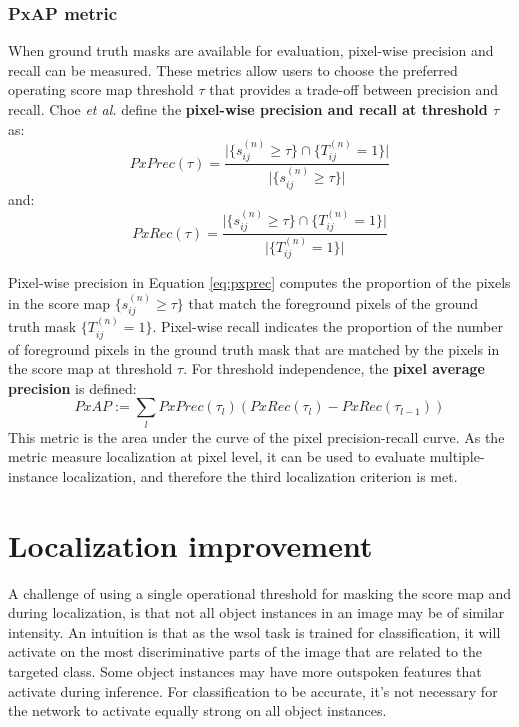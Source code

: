 \subsubsection{PxAP metric}

When ground truth masks are available for evaluation, pixel-wise precision and recall can be measured. These metrics allow users to choose the preferred operating score map threshold $\tau$ that provides a trade-off between precision and recall. Choe \textit{et al.} define the \textbf{pixel-wise precision and recall at threshold $\tau$} as:
\begin{equation} \label{eq:pxprec}
    PxPrec(\tau) = \frac{\lvert \{ s^{(n)}_{ij} \ge \tau \} \cap \{ T^{(n)}_{ij} = 1 \} \rvert}{\lvert \{ s^{(n)}_{ij} \ge \tau \} \rvert}
\end{equation}
and:
\begin{equation} \label{eq:pxrec}
    PxRec(\tau) = \frac{\lvert \{ s^{(n)}_{ij} \ge \tau \} \cap \{ T^{(n)}_{ij} = 1 \} \rvert}{\lvert \{ T^{(n)}_{ij} = 1 \} \rvert}
\end{equation}

Pixel-wise precision in Equation \ref{eq:pxprec} computes the proportion of the pixels in the score map $\{ s^{(n)}_{ij} \ge \tau \}$ that match the foreground pixels of the ground truth mask $\{ T^{(n)}_{ij} = 1 \}$. Pixel-wise recall indicates the proportion of the number of foreground pixels in the ground truth mask that are matched by the pixels in the score map at threshold $\tau$. For threshold independence, the \textbf{pixel average precision} is defined:
\begin{equation}
    PxAP := \sum_{l} PxPrec(\tau_{l})(PxRec(\tau_{l}) - PxRec(\tau_{l-1}))
\end{equation}
This metric is the area under the curve of the pixel precision-recall curve. As the metric measure localization at pixel level, it can be used to evaluate multiple-instance localization, and therefore the third localization criterion is met.

\section{Localization improvement} \label{sec:method_localization_improvement}
A challenge of using a single operational threshold for masking the score map and during localization, is that not all object instances in an image may be of similar intensity. An intuition is that as the \acrshort{wsol} task is trained for classification, it will activate on the most discriminative parts of the image that are related to the targeted class. Some object instances may  have more outspoken features that activate during inference. For classification to be accurate, it's not necessary for the network to activate equally strong on all object instances.

